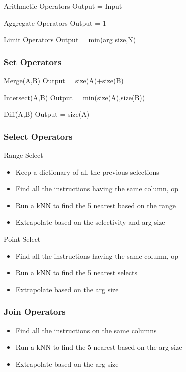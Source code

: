 \begin{frame}
\begin{block}{Arithmetic Operators}
Output = Input
\end{block}
\begin{block}{Aggregate Operators}
Output = 1
\end{block}
\begin{block}{Limit Operators}
Output = min(arg size,N)
\end{block}
\end{frame}

\begin{frame}
\frametitle{Set Operators}
\begin{block}{Merge(A,B)}
Output = size(A)+size(B)
\end{block}
\begin{block}{Intersect(A,B)}
Output = min(size(A),size(B))
\end{block}
\begin{block}{Diff(A,B)}
Output = size(A)
\end{block}
\end{frame}

\begin{frame}
\frametitle{Select Operators}
\begin{block}{Range Select}
\begin{itemize}
\item Keep a dictionary of all the previous selections
\item Find all the instructions having the same column, op
\item Run a kNN to find the 5 nearest based on the range
\item Extrapolate based on the selectivity and arg size
\end{itemize}
\end{block}
\begin{block}{Point Select}
\begin{itemize}
\item Find all the instructions having the same column, op
\item Run a kNN to find the 5 nearest selects
\item Extrapolate based on the arg size
\end{itemize}
\end{block}
\end{frame}

\begin{frame}
\frametitle{Join Operators}
\begin{itemize}
\item Find all the instructions on the same columns
\item Run a kNN to find the 5 nearest based on the arg size
\item Extrapolate based on the arg size
\end{itemize}
\end{frame}
